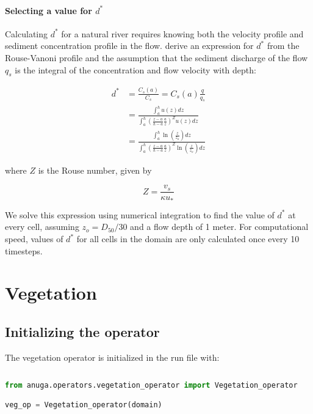 \documentclass[10pt]{article}
\begin{document}
\paragraph{Selecting a value for $d^*$}

Calculating $d^*$ for a natural river requires knowing both the velocity profile and sediment concentration profile in the flow. \citet{davy2009fluvial} derive an expression for $d^*$ from the Rouse-Vanoni profile and the assumption that the sediment discharge of the flow $q_s$ is the integral of the concentration and flow velocity with depth:

\begin{equation}
\begin{split}
d^* & = \frac{C_s(a)}{C_s} = C_s(a) \frac{q}{q_s} \\
& = \frac{\int_{a}^{h} u(z) dz}{\int_{a}^{h} (\frac{z-a}{h-a}\frac{a}{z})^Z u(z) dz} \\
& = \frac{\int_{a}^{h} \ln{(\frac{z}{z_o})} dz}{\int_{a}^{h} (\frac{z-a}{h-a}\frac{a}{z})^Z \ln{(\frac{z}{z_o})} dz}
\end{split}
\end{equation} 

\noindent where $Z$ is the Rouse number, given by

\begin{equation}
Z = \frac{v_s}{\kappa u_*}
\end{equation}

We solve this expression using numerical integration to find the value of $d^*$ at every cell, assuming $z_o = D_{50}/30$ and a flow depth of 1 meter. For computational speed, values of $d^*$ for all cells in the domain are only calculated once every 10 timesteps.

\section{Vegetation}

\subsection{Initializing the operator}

The vegetation operator is initialized in the run file with:

\begin{minipage}[c]{0.95\textwidth}
\begin{lstlisting}[language=Python, title=Initializing the vegetation operator]
 
from anuga.operators.vegetation_operator import Vegetation_operator

veg_op = Vegetation_operator(domain)

\end{lstlisting}
\end{minipage}
\ \\
\end{document}
